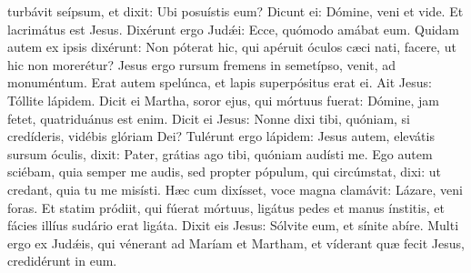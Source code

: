 \begin{paracol}{2}
{turbávit seípsum, et dixit: Ubi posuístis eum? Dicunt ei: Dómine, veni et vide. Et lacrimátus est Jesus. Dixérunt ergo Judǽi: Ecce, quómodo amábat eum. Quidam autem ex ipsis dixérunt: Non póterat hic, qui apéruit óculos cæci nati, facere, ut hic non morerétur? Jesus ergo rursum fremens in semetípso, venit, ad monuméntum. Erat autem spelúnca, et lapis superpósitus erat ei. Ait Jesus: Tóllite lápidem. Dicit ei Martha, soror ejus, qui mórtuus fuerat: Dómine, jam fetet, quatriduánus est enim. Dicit ei Jesus: Nonne dixi tibi, quóniam, si credíderis, vidébis glóriam Dei? Tulérunt ergo lápidem: Jesus autem, elevátis sursum óculis, dixit: Pater, grátias ago tibi, quóniam audísti me. Ego autem sciébam, quia semper me audis, sed propter pópulum, qui circúmstat, dixi: ut credant, quia tu me misísti. Hæc cum dixísset, voce magna clamávit: Lázare, veni foras. Et statim pródiit, qui fúerat mórtuus, ligátus pedes et manus ínstitis, et fácies illíus sudário erat ligáta. Dixit eis Jesus: Sólvite eum, et sínite abíre. Multi ergo ex Judǽis, qui vénerant ad Maríam et Martham, et víderant quæ fecit Jesus, credidérunt in eum.
}\switchcolumn\portugues{
}
\end{paracol}
